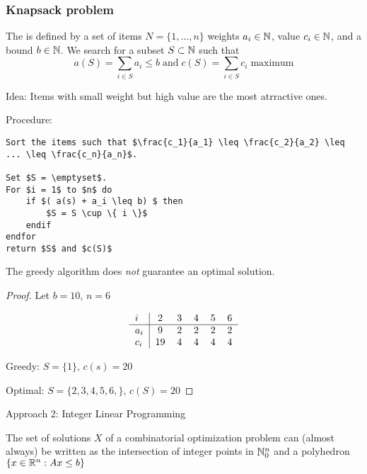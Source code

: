 \begin{lec}[2011-10-26]\end{lec}

\subsubsection*{Knapsack problem} 

\begin{defn} %
	The  is defined by a set of items $N = \{ 1, ... , n \}$ weights $a_i \in \mathbb{N}$, value $c_i \in \mathbb{N}$, and a bound $b\in \mathbb{N}$. We search for a subset $S\subset \mathbb{N}$ such that 
	\[
		a(S) = \sum_{i \in S} a_i \leq b \; \text{and} \; c(S) = \sum_{i\in S} c_i \; \text{maximum}
	\]
\end{defn}


Idea: Items with small weight but high value are the most atrractive ones.

Procedure:
\begin{lstlisting}
Sort the items such that $\frac{c_1}{a_1} \leq \frac{c_2}{a_2} \leq ... \leq \frac{c_n}{a_n}$.

Set $S = \emptyset$.
For $i = 1$ to $n$ do
	if $( a(s) + a_i \leq b) $ then
		$S = S \cup \{ i \}$
	endif
endfor
return $S$ and $c(S)$
\end{lstlisting}

\begin{thm}
	The greedy algorithm does \emph{ not } guarantee an optimal solution.
\end{thm}

\begin{proof}
	Let $b=10$, $n = 6$
	
	\begin{align*}
		\begin{tabular}{l|ccccc}
			$i$ & 2 & 3 & 4 & 5 & 6 \\ \hline
			$a_i$ & 9 & 2 & 2 & 2 & 2 \\
			$c_i$ &19 & 4 & 4 & 4 & 4
		\end{tabular}
	\end{align*}
	
	Greedy: $S=\{1\}$, $c(s)=20$
	
	Optimal: $S=\{2,3,4,5,6,\}$, $c(S)=20$
\end{proof}

Approach 2: Integer Linear Programming

The set of solutions $X$ of a combinatorial optimization problem can (almost always) be written as the intersection of integer points in $\mathbb{N}_0^n$ and a polyhedron $\{x \in \mathbb{R}^n: Ax\leq b\}$

